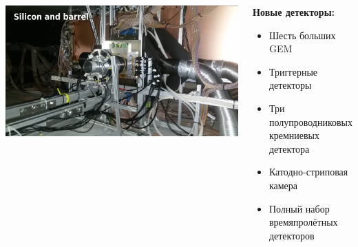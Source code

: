\documentclass[dvipsnames] {beamer}
\begin{document}
\begin{frame}
\begin{columns}[t]
      \includegraphics[width=1.\linewidth]{Si_and_Barrel.jpg} \\
    {\footnotesize
       \begin{block}{\bf \centering Новые детекторы:}
         \begin{itemize}
         \item Шесть больших GEM
         \item Триггерные детекторы
         \item Три полупроводниковых кремниевых детектора
         \item Катодно-стриповая камера
         \item Полный набор времяпролётных детекторов        
         \end{itemize}
       \end{block}
     }
  \end{columns}
\end{frame}
\end{document}
